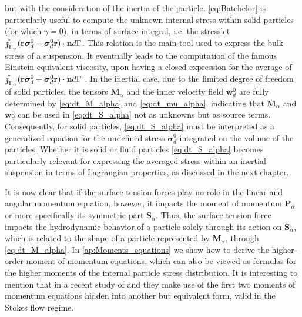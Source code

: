 but with the consideration of the inertia of the particle.
\ref{eq:Batchelor} is particularly useful to compute the unknown internal stress within solid particles (for which $\gamma = 0$), in terms of surface integral, i.e. the stresslet $\oint_{\Gamma_{\alpha}} (\textbf{r}\bm\sigma_d^0+ \bm\sigma_d^0\textbf{r})\cdot \textbf{n} d\Gamma$.
This relation is the main tool used to express the bulk stress of a suspension.
It eventually leads to the computation of the famous Einstein equivalent viscosity, upon having a closed expression for the average of $\oint_{\Gamma_{\alpha}} (\textbf{r}\bm\sigma_d^0+ \bm\sigma_d^0\textbf{r})\cdot \textbf{n} d\Gamma$ \citep{guazzelli2011}. 
In the inertial case, due to the limited degree of freedom of solid particles, the tensors $\textbf{M}_\alpha$ and the inner velocity field $\textbf{w}_d^0$ are fully determined by \ref{eq:dt_M_alpha} and \ref{eq:dt_mu_alpha}, indicating that $\textbf{M}_\alpha$ and $\textbf{w}_d^0$ can be used in \ref{eq:dt_S_alpha} not as unknowns but as source terms. 
Consequently, for solid particles, \ref{eq:dt_S_alpha} must be interpreted as a generalized equation for the undefined stress $\bm\sigma_d^0$ integrated on the volume of the particles.
Whether it is solid or fluid particles \ref{eq:dt_S_alpha} becomes particularly relevant for expressing the averaged stress within an inertial suspension in terms of Lagrangian properties, as discussed in the next chapter. 

It is now clear that if the surface tension forces play no role in the linear and angular momentum equation, however, it impacts the moment of momentum $\textbf{P}_\alpha$ or more specifically its symmetric part $\textbf{S}_\alpha$.
Thus, the surface tension force impacts the hydrodynamic behavior of a particle solely through its action on $\textbf{S}_\alpha$, which is related to the shape of a particle represented by $\textbf{M}_\alpha$, through \ref{eq:dt_M_alpha}.
In \ref{ap:Moments_equations} we show how to derive the higher-order moment of momentum equations, which can also be viewed as formulas for the higher moments of the internal particle stress distribution. 
It is interesting to mention that in a recent study of \citet{dolata2021faxen} and \citet{zhou2020lamb} they make use of the first two moments of momentum equations hidden into another but equivalent form, valid in the Stokes flow regime. 


